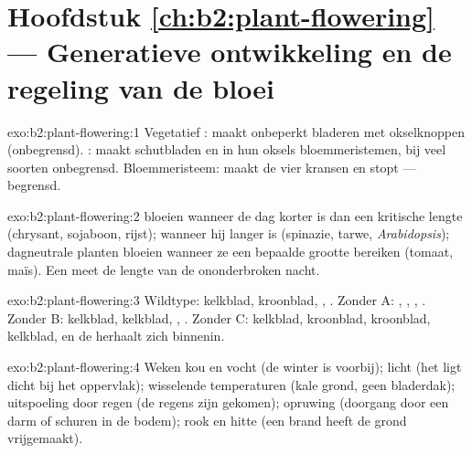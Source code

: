 \section*{Hoofdstuk \ref{ch:b2:plant-flowering} --- Generatieve ontwikkeling en de regeling van de bloei}

\begin{solution}{exo:b2:plant-flowering:1}
Vegetatief : maakt onbeperkt bladeren met okselknoppen
(onbegrensd). : maakt schutbladen en in hun oksels
bloemmeristemen, bij veel soorten onbegrensd. Bloemmeristeem: maakt de vier
kransen en stopt --- begrensd.
\end{solution}

\begin{solution}{exo:b2:plant-flowering:2}
 bloeien wanneer de dag korter is dan een kritische lengte
(chrysant, sojaboon, rijst);  wanneer hij langer is
(spinazie, tarwe, \emph{Arabidopsis}); dagneutrale planten bloeien wanneer
ze een bepaalde grootte bereiken (tomaat, maïs). Een  meet de
lengte van de ononderbroken nacht.
\end{solution}

\begin{solution}{exo:b2:plant-flowering:3}
Wildtype: kelkblad, kroonblad, , . Zonder A: ,
, , . Zonder B: kelkblad, kelkblad, ,
. Zonder C: kelkblad, kroonblad, kroonblad, kelkblad, en de 
herhaalt zich binnenin.
\end{solution}

\begin{solution}{exo:b2:plant-flowering:4}
Weken kou en vocht (de winter is voorbij); licht (het  ligt dicht bij
het oppervlak); wisselende temperaturen (kale grond, geen bladerdak);
uitspoeling door regen (de regens zijn gekomen); opruwing (doorgang door een
darm of schuren in de bodem); rook en hitte (een brand heeft de grond
vrijgemaakt).
\end{solution}

